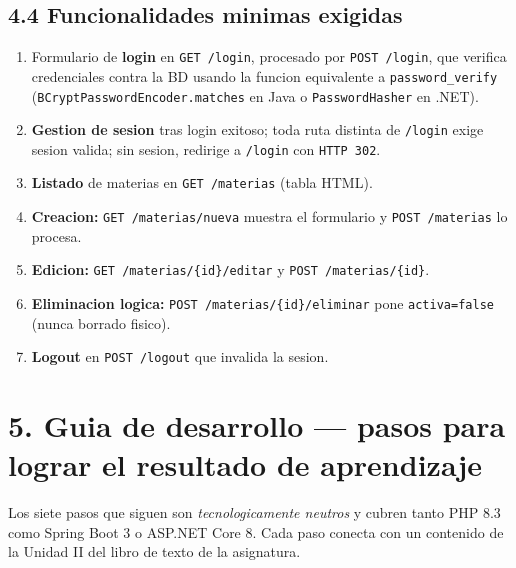 \documentclass[10pt,a4paper]{article}
\begin{document}
\subsection*{4.4 Funcionalidades minimas exigidas}
\begin{enumerate}[leftmargin=1.4em,itemsep=1pt,topsep=2pt]
    \item Formulario de \textbf{login} en \texttt{GET /login}, procesado por \texttt{POST /login}, que verifica credenciales contra la BD usando la funcion equivalente a \texttt{password\_verify} (\texttt{BCryptPasswordEncoder.matches} en Java o \texttt{PasswordHasher} en .NET).
    \item \textbf{Gestion de sesion} tras login exitoso; toda ruta distinta de \texttt{/login} exige sesion valida; sin sesion, redirige a \texttt{/login} con \texttt{HTTP 302}.
    \item \textbf{Listado} de materias en \texttt{GET /materias} (tabla HTML).
    \item \textbf{Creacion:} \texttt{GET /materias/nueva} muestra el formulario y \texttt{POST /materias} lo procesa.
    \item \textbf{Edicion:} \texttt{GET /materias/\{id\}/editar} y \texttt{POST /materias/\{id\}}.
    \item \textbf{Eliminacion logica:} \texttt{POST /materias/\{id\}/eliminar} pone \texttt{activa=false} (nunca borrado fisico).
    \item \textbf{Logout} en \texttt{POST /logout} que invalida la sesion.
\end{enumerate}

\clearpage

\section*{5. Guia de desarrollo --- pasos para lograr el resultado de aprendizaje}
Los siete pasos que siguen son \emph{tecnologicamente neutros} y cubren tanto PHP 8.3 como Spring Boot 3 o ASP.NET Core 8. Cada paso conecta con un contenido de la Unidad II del libro de texto de la asignatura.
\end{document}
